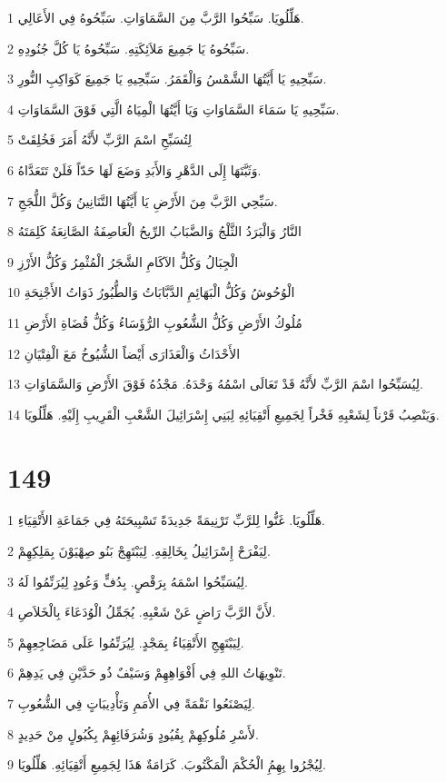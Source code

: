 \par 1 هَلِّلُويَا. سَبِّحُوا الرَّبَّ مِنَ السَّمَاوَاتِ. سَبِّحُوهُ فِي الأَعَالِي.
\par 2 سَبِّحُوهُ يَا جَمِيعَ مَلاَئِكَتِهِ. سَبِّحُوهُ يَا كُلَّ جُنُودِهِ.
\par 3 سَبِّحِيهِ يَا أَيَّتُهَا الشَّمْسُ وَالْقَمَرُ. سَبِّحِيهِ يَا جَمِيعَ كَوَاكِبِ النُّورِ.
\par 4 سَبِّحِيهِ يَا سَمَاءَ السَّمَاوَاتِ وَيَا أَيَّتُهَا الْمِيَاهُ الَّتِي فَوْقَ السَّمَاوَاتِ.
\par 5 لِتُسَبِّحِ اسْمَ الرَّبِّ لأَنَّهُ أَمَرَ فَخُلِقَتْ
\par 6 وَثَبَّتَهَا إِلَى الدَّهْرِ وَالأَبَدِ وَضَعَ لَهَا حَدّاً فَلَنْ تَتَعَدَّاهُ.
\par 7 سَبِّحِي الرَّبَّ مِنَ الأَرْضِ يَا أَيَّتُهَا التَّنَانِينُ وَكُلَّ اللُّجَجِ.
\par 8 النَّارُ وَالْبَرَدُ الثَّلْجُ وَالضَّبَابُ الرِّيحُ الْعَاصِفَةُ الصَّانِعَةُ كَلِمَتَهُ
\par 9 الْجِبَالُ وَكُلُّ الآكَامِ الشَّجَرُ الْمُثْمِرُ وَكُلُّ الأَرْزِ
\par 10 الْوُحُوشُ وَكُلُّ الْبَهَائِمِ الدَّبَّابَاتُ وَالطُّيُورُ ذَوَاتُ الأَجْنِحَةِ
\par 11 مُلُوكُ الأَرْضِ وَكُلُّ الشُّعُوبِ الرُّؤَسَاءُ وَكُلُّ قُضَاةِ الأَرْضِ
\par 12 الأَحْدَاثُ وَالْعَذَارَى أَيْضاً الشُّيُوخُ مَعَ الْفِتْيَانِ
\par 13 لِيُسَبِّحُوا اسْمَ الرَّبِّ لأَنَّهُ قَدْ تَعَالَى اسْمُهُ وَحْدَهُ. مَجْدُهُ فَوْقَ الأَرْضِ وَالسَّمَاوَاتِ.
\par 14 وَيَنْصِبُ قَرْناً لِشَعْبِهِ فَخْراً لِجَمِيعِ أَتْقِيَائِهِ لِبَنِي إِسْرَائِيلَ الشَّعْبِ الْقَرِيبِ إِلَيْهِ. هَلِّلُويَا.

\chapter{149}

\par 1 هَلِّلُويَا. غَنُّوا لِلرَّبِّ تَرْنِيمَةً جَدِيدَةً تَسْبِيحَتَهُ فِي جَمَاعَةِ الأَتْقِيَاءِ.
\par 2 لِيَفْرَحْ إِسْرَائِيلُ بِخَالِقِهِ. لِيَبْتَهِجْ بَنُو صِهْيَوْنَ بِمَلِكِهِمْ.
\par 3 لِيُسَبِّحُوا اسْمَهُ بِرَقْصٍ. بِدُفٍّ وَعُودٍ لِيُرَنِّمُوا لَهُ.
\par 4 لأَنَّ الرَّبَّ رَاضٍ عَنْ شَعْبِهِ. يُجَمِّلُ الْوُدَعَاءَ بِالْخَلاَصِ.
\par 5 لِيَبْتَهِجِ الأَتْقِيَاءُ بِمَجْدٍ. لِيُرَنِّمُوا عَلَى مَضَاجِعِهِمْ.
\par 6 تَنْوِيهَاتُ اللهِ فِي أَفْوَاهِهِمْ وَسَيْفٌ ذُو حَدَّيْنِ فِي يَدِهِمْ.
\par 7 لِيَصْنَعُوا نَقْمَةً فِي الأُمَمِ وَتَأْدِيبَاتٍ فِي الشُّعُوبِ.
\par 8 لأَسْرِ مُلُوكِهِمْ بِقُيُودٍ وَشُرَفَائِهِمْ بِكُبُولٍ مِنْ حَدِيدٍ.
\par 9 لِيُجْرُوا بِهِمُِ الْحُكْمَ الْمَكْتُوبَ. كَرَامَةٌ هَذَا لِجَمِيعِ أَتْقِيَائِهِ. هَلِّلُويَا.

